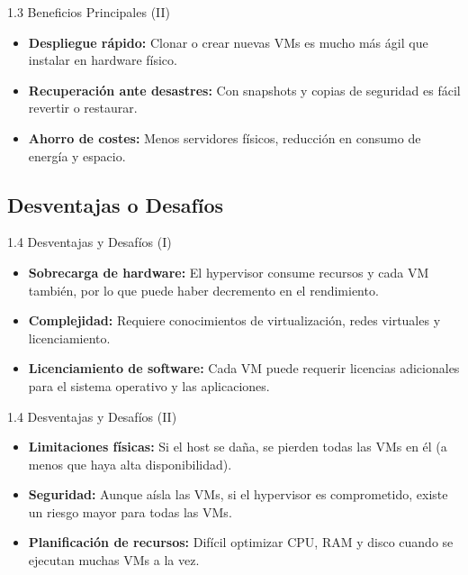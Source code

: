 \documentclass{beamer}
\begin{document}
\begin{frame}{1.3 Beneficios Principales (II)}
    \begin{itemize}
        \item \textbf{Despliegue rápido:} Clonar o crear nuevas VMs es mucho más ágil que instalar en hardware físico.
        \item \textbf{Recuperación ante desastres:} Con snapshots y copias de seguridad es fácil revertir o restaurar.
        \item \textbf{Ahorro de costes:} Menos servidores físicos, reducción en consumo de energía y espacio.
    \end{itemize}
\end{frame}

\subsection{Desventajas o Desafíos}
\begin{frame}{1.4 Desventajas y Desafíos (I)}
    \begin{itemize}
        \item \textbf{Sobrecarga de hardware:} El hypervisor consume recursos y cada VM también, por lo que puede haber decremento en el rendimiento.
        \item \textbf{Complejidad:} Requiere conocimientos de virtualización, redes virtuales y licenciamiento.
        \item \textbf{Licenciamiento de software:} Cada VM puede requerir licencias adicionales para el sistema operativo y las aplicaciones.
    \end{itemize}
\end{frame}

\begin{frame}{1.4 Desventajas y Desafíos (II)}
    \begin{itemize}
        \item \textbf{Limitaciones físicas:} Si el host se daña, se pierden todas las VMs en él (a menos que haya alta disponibilidad).
        \item \textbf{Seguridad:} Aunque aísla las VMs, si el hypervisor es comprometido, existe un riesgo mayor para todas las VMs.
        \item \textbf{Planificación de recursos:} Difícil optimizar CPU, RAM y disco cuando se ejecutan muchas VMs a la vez.
    \end{itemize}
\end{frame}
\end{document}
